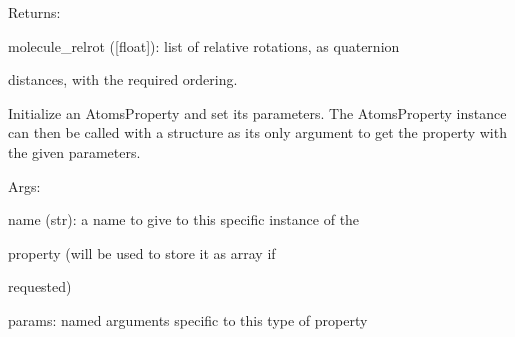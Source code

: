 \documentclass[letterpaper,10pt,english]{sphinxmanual}
\begin{document}
\begin{fulllineitems}
\begin{DUlineblock}{0em}
\item[] Returns:
\item[]
\begin{DUlineblock}{\DUlineblockindent}
\item[] molecule\_relrot ({[}float{]}): list of relative rotations, as quaternion
\item[]
\begin{DUlineblock}{\DUlineblockindent}
\item[] distances, with the required ordering.
\end{DUlineblock}
\end{DUlineblock}
\end{DUlineblock}

Initialize an AtomsProperty and set its parameters.
The AtomsProperty instance can then be called with a structure as its
only argument to get the property with the given parameters.

\begin{DUlineblock}{0em}
\item[] Args:
\item[]
\begin{DUlineblock}{\DUlineblockindent}
\item[] name (str): a name to give to this specific instance of the
\item[]
\begin{DUlineblock}{\DUlineblockindent}
\item[] property (will be used to store it as array if
\item[] requested)
\end{DUlineblock}
\item[] params: named arguments specific to this type of property
\end{DUlineblock}
\end{DUlineblock}

\begin{fulllineitems}
\label{doctree/soprano.properties.linkage.linkage:soprano.properties.linkage.linkage.MoleculeRelativeRotation.default_name}
\end{fulllineitems}



\end{fulllineitems}
\end{document}
